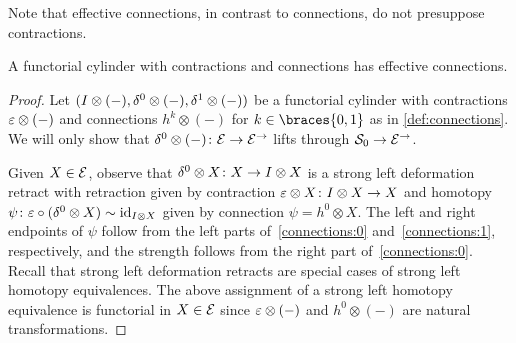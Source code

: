 \documentclass[reqno,10pt,a4paper,oneside,draft]{amsart}
\begin{document}
Note that effective connections, in contrast to connections, do not presuppose contractions.

\begin{proposition} \label{connections-are-effective}
A functorial cylinder with contractions and connections has effective connections.
\end{proposition}

\begin{proof}
Let $(I \otimes (-), \delta^0 \otimes (-), \delta^1 \otimes (-))$ be a functorial cylinder with contractions $\varepsilon \otimes (-)$ and connections $h^k \otimes (-)$ for $k \in \braces{0, 1}$ as in \cref{def:connections}.
We will only show that $\delta^0 \otimes (-) \colon \mathcal{E} \to \mathcal{E}^\to$ lifts through $\mathcal{S}_0 \to \mathcal{E}^\to$.

Given $X \in \mathcal{E}$, observe that $\delta^0 \otimes X \colon X \to I \otimes X$ is a strong left deformation retract with retraction given by contraction $\varepsilon \otimes X \colon I \otimes X \to X$ and homotopy $\psi \colon \varepsilon \mathbin{\circ} (\delta^0 \otimes X) \sim \operatorname{id}_{I \otimes X}$ given by connection $\psi = h^0 \otimes X$.
The left and right endpoints of $\psi$ follow from the left parts of~\eqref{connections:0} and~\eqref{connections:1}, respectively, and the strength follows from the right part of~\eqref{connections:0}.
Recall that strong left deformation retracts are special cases of strong left homotopy equivalences.
The above assignment of a strong left homotopy equivalence is functorial in $X \in \mathcal{E}$ since $\varepsilon \otimes (-)$ and $h^0 \otimes (-)$ are natural transformations.
\end{proof}
\end{document}
